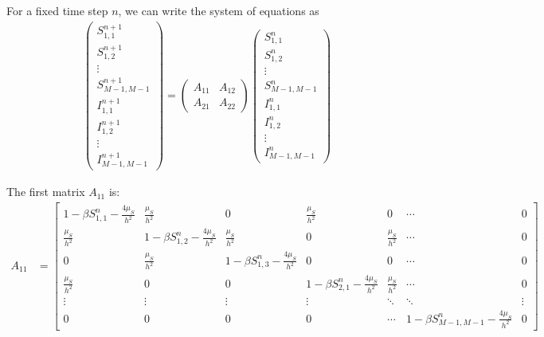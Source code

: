 For a fixed time step \(n\), we can write the system of equations as
\begin{align*}
  \begin{pmatrix}
    S_{1,1}^{n+1}     \\
    S_{1,2}^{n+1}     \\
    \vdots            \\
    S_{M-1,M-1}^{n+1} \\
    I_{1,1}^{n+1}     \\
    I_{1,2}^{n+1}     \\
    \vdots            \\
    I_{M-1,M-1}^{n+1}
  \end{pmatrix}
  =
  \begin{pmatrix}
    A_{11} & A_{12} \\
    A_{21} & A_{22}
  \end{pmatrix}
  \begin{pmatrix}
    S_{1,1}^n     \\
    S_{1,2}^n     \\
    \vdots        \\
    S_{M-1,M-1}^n \\
    I_{1,1}^n     \\
    I_{1,2}^n     \\
    \vdots        \\
    I_{M-1,M-1}^n
  \end{pmatrix}
\end{align*}


The first matrix \(A_{11}\) is:
\small
\begin{align*}
    A_{11} &= \scriptscriptstyle
    \begin{bmatrix}
        1 - \beta S_{1,1}^n - \tfrac{4\mu_S}{h^2} & \tfrac{\mu_S}{h^2} & 0 & \tfrac{\mu_S}{h^2} & 0 & \cdots & 0 \\
        \tfrac{\mu_S}{h^2} & 1 - \beta S_{1,2}^n - \tfrac{4\mu_S}{h^2} & \tfrac{\mu_S}{h^2} & 0 & \tfrac{\mu_S}{h^2} & \cdots & 0 \\
        0 & \frac{\mu_S}{h^2} & 1 - \beta S_{1,3}^n - \tfrac{4\mu_S}{h^2} & 0 & 0 & \cdots & 0 \\
        \tfrac{\mu_S}{h^2} & 0 & 0 & 1 - \beta S_{2,1}^n - \tfrac{4\mu_S}{h^2} & \tfrac{\mu_S}{h^2} & \cdots & 0 \\
        \vdots & \vdots & \vdots & \vdots & \ddots & \ddots & \vdots \\
        0 & 0 & 0 & 0 & \cdots & 1 - \beta S_{M-1,M-1}^n - \tfrac{4\mu_S}{h^2} & 0
    \end{bmatrix}
\end{align*}

